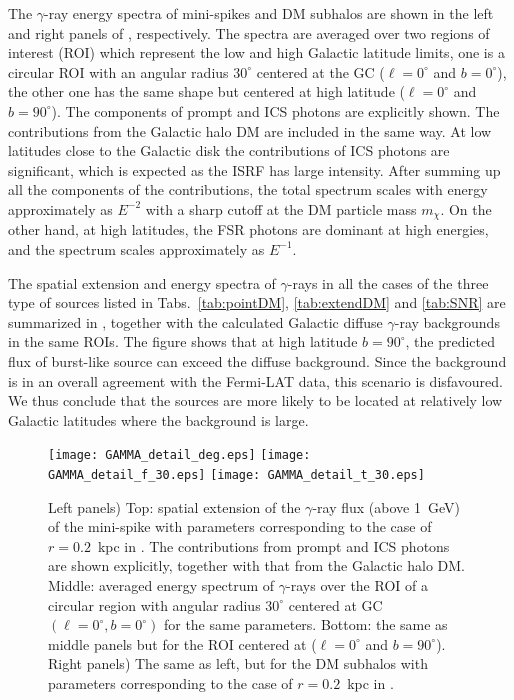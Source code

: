 The $\gamma$-ray energy spectra of mini-spikes and DM subhalos 
are shown in the left and right panels of , 
respectively. 
The spectra are averaged over two regions of interest (ROI)
which represent the low and high Galactic latitude limits,
one is a circular ROI with an angular radius $30^{\circ}$ centered
at the GC ($\ell=0^{\circ}$ and $b=0^{\circ}$), 
the other one has the same shape but centered at 
high latitude   ($\ell=0^{\circ}$ and $b=90^{\circ}$).
The components of prompt and ICS photons are explicitly shown.
The contributions from the Galactic halo DM are included in the same way.
At low latitudes  close to the Galactic disk
the contributions of ICS photons are significant,
which is expected as the ISRF has large intensity.
After summing up all the components of the contributions, 
the total spectrum scales with energy approximately as $E^{-2}$
with a sharp cutoff at the DM particle mass $m_{\chi}$.
On the other hand, at high latitudes, the FSR photons are dominant at
high energies, and the spectrum scales approximately as $E^{-1}$.


The spatial extension and energy spectra of $\gamma$-rays  
in all the cases of  the three type of sources 
listed in Tabs.~\ref{tab:pointDM}, \ref{tab:extendDM} and \ref{tab:SNR} are
summarized  in  ,
together with the calculated Galactic diffuse $\gamma$-ray backgrounds 
in the same ROIs.
The figure shows that at high latitude $b=90^{\circ}$, 
the predicted flux of burst-like source can exceed the diffuse background.
Since the background is in an overall agreement with the Fermi-LAT data,
this scenario is disfavoured. 
We thus conclude that the sources are more likely to be located 
at relatively low Galactic latitudes where the background is large.


\begin{figure}[!htbp]
\begin{center}
\texttt{[image: GAMMA\_detail\_deg.eps]}
\texttt{[image: GAMMA\_detail\_f\_30.eps]}
\texttt{[image: GAMMA\_detail\_t\_30.eps]}
\caption{
Left panels)
Top: 
spatial extension of the $\gamma$-ray flux (above 1~GeV) of 
the  mini-spike with parameters corresponding to the case of $r=0.2$~kpc in .
The contributions from prompt and ICS photons are shown explicitly, 
together with that from the Galactic halo DM.
Middle:
averaged energy spectrum of $\gamma$-rays over  
the ROI of a circular region with angular radius $30^{\circ}$ centered
at GC $(\ell=0^{\circ}, b=0^{\circ})$ 
for the same parameters.
Bottom:
the same as middle panels but for the ROI centered at  ($\ell=0^{\circ}$ and $b=90^{\circ}$).
Right panels)
The same as left, but for the DM subhalos with 
parameters corresponding to the case of $r=0.2$~kpc in .
}
\label{fig:GAMMA_DM_energy}
\end{center}
\end{figure} 










